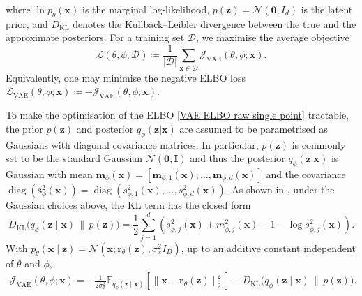 \documentclass[pdflatex,sn-mathphys-num]{sn-jnl}%
\theoremstyle{thmstyleone}%
\theoremstyle{thmstyletwo}%
\theoremstyle{thmstylethree}%
\begin{document}
where $\ln p_{\theta}(\mathbf{x})$ is the marginal log-likelihood, \(p(\mathbf z)=\mathcal N(\mathbf 0,I_d)\) is the latent prior, and \(D_{\mathrm{KL}}\) denotes the Kullback--Leibler divergence between the true and the approximate posteriors. For a training set \(\mathcal D\), we maximise the average objective
\begin{equation}\label{VAE ELBO raw}
    \mathcal L(\theta,\phi;\mathcal D)
    \coloneq
    \frac{1}{|\mathcal D|}
    \sum_{\mathbf x\in\mathcal D}
    \mathcal J_{\mathrm{VAE}}(\theta,\phi;\mathbf x).
\end{equation}
Equivalently, one may minimise the negative ELBO loss \(\mathcal L_{\mathrm{VAE}}(\theta,\phi;\mathbf x)\coloneq -\mathcal J_{\mathrm{VAE}}(\theta,\phi;\mathbf x)\).

To make the optimisation of the ELBO \eqref{VAE ELBO raw single point} tractable, the prior $p(\mathbf{z})$ and posterior $q_{\phi}(\mathbf{z|x})$ are assumed to be parametrised as Gaussians with diagonal covariance matrices. In particular, $p(\mathbf{z})$ is commonly set to be the standard Gaussian $\mathcal{N}(\boldsymbol{0}, \mathbf{I})$ and thus the posterior $q_{\phi}(\mathbf{z|x})$ is Gaussian with mean $\mathbf m_\phi(\mathbf x) = \left[\mathbf{m}_{\phi,1}(\mathbf{x}), \ldots, \mathbf{m}_{\phi, d}(\mathbf{x})\right]$ and the covariance $\operatorname{diag}(\mathbf s_\phi^2(\mathbf x)) = \operatorname{diag}(s_{\phi,1}^2(\mathbf x), \ldots, s_{\phi,d}^2(\mathbf x))$. As shown in \cite{kingma2022autoencodingvariationalbayes}, under the Gaussian choices above, the KL term has the closed form
\[
    D_{\mathrm{KL}}
    \bigl(q_\phi(\mathbf z\mid\mathbf x)\,\|\,p(\mathbf z)\bigr)
    =
    \frac12
    \sum_{j=1}^d
    \left(
        s_{\phi,j}^2(\mathbf x)
        +
        m_{\phi,j}^2(\mathbf x)
        -
        1
        -
        \log s_{\phi,j}^2(\mathbf x)
    \right).
\]
With \(p_\theta(\mathbf x\mid\mathbf z) = \mathcal N(\mathbf x;\mathbf r_\theta(\mathbf z),\sigma_x^2 I_D)\), up to an additive constant independent of \(\theta\) and \(\phi\),
\begin{equation}\label{ELBO}
    \begin{split}
        \mathcal J_{\mathrm{VAE}}(\theta,\phi;\mathbf x)
    =
    -
    \frac{1}{2\sigma_x^2}
    \mathbb E_{q_\phi(\mathbf z\mid\mathbf x)}
    \left[
        \|\mathbf x-\mathbf r_\theta(\mathbf z)\|_2^2
    \right]
    -
    D_{\mathrm{KL}}
    \bigl(q_\phi(\mathbf z\mid\mathbf x)\,\|\,p(\mathbf z)\bigr).
    \end{split}
\end{equation}
\end{document}
